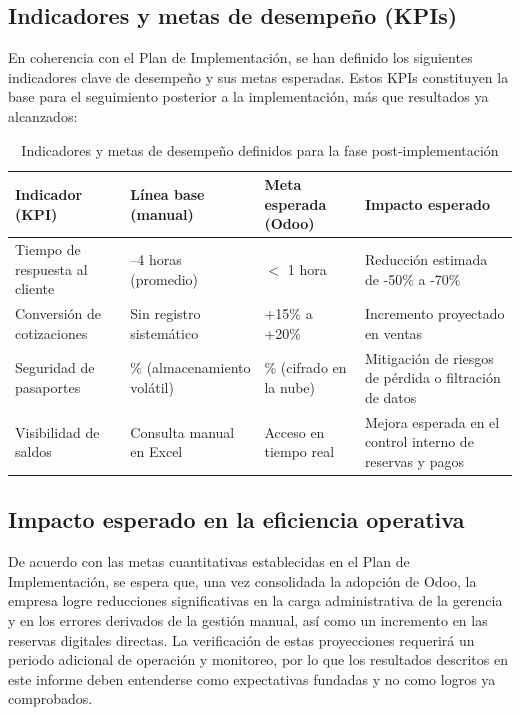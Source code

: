 \subsection{Indicadores y metas de desempeño (KPIs)}

\begin{indentedsubsection}
En coherencia con el Plan de Implementación, se han definido los siguientes indicadores clave de desempeño y sus metas esperadas. Estos KPIs constituyen la base para el seguimiento posterior a la implementación, más que resultados ya alcanzados:
\end{indentedsubsection}

\begin{table}[h]
    \centering
    \begin{tabularx}{\textwidth}{|>{\hsize=1.0\hsize}X|>{\hsize=0.9\hsize}X|>{\hsize=0.9\hsize}X|>{\hsize=1.2\hsize}X|}
        \hline
        \textbf{Indicador (KPI)} & \textbf{Línea base (manual)} & \textbf{Meta esperada (Odoo)} & \textbf{Impacto esperado} \\
        \hline
        Tiempo de respuesta al cliente & 2--4 horas (promedio) & $<$ 1 hora & Reducción estimada de -50\% a -70\% \\
        \hline
        Conversión de cotizaciones & Sin registro sistemático & +15\% a +20\% & Incremento proyectado en ventas \\
        \hline
        Seguridad de pasaportes & 0\% (almacenamiento volátil) & 100\% (cifrado en la nube) & Mitigación de riesgos de pérdida o filtración de datos \\
        \hline
        Visibilidad de saldos & Consulta manual en Excel & Acceso en tiempo real & Mejora esperada en el control interno de reservas y pagos \\
        \hline
    \end{tabularx}
    \caption{Indicadores y metas de desempeño definidos para la fase post-implementación}
\end{table}

\subsection{Impacto esperado en la eficiencia operativa}

\begin{indentedsubsection}
De acuerdo con las metas cuantitativas establecidas en el Plan de Implementación, se espera que, una vez consolidada la adopción de Odoo, la empresa logre reducciones significativas en la carga administrativa de la gerencia y en los errores derivados de la gestión manual, así como un incremento en las reservas digitales directas. La verificación de estas proyecciones requerirá un periodo adicional de operación y monitoreo, por lo que los resultados descritos en este informe deben entenderse como expectativas fundadas y no como logros ya comprobados.

\end{indentedsubsection}

